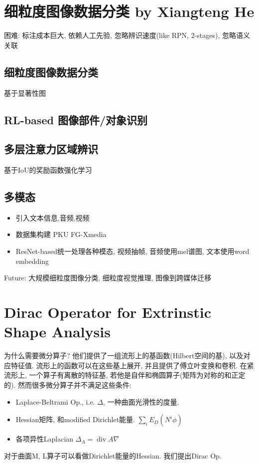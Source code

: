 \documentclass{article}
\begin{document}
\section{细粒度图像数据分类 by Xiangteng He}

困难: 标注成本巨大, 依赖人工先验, 忽略辨识速度(like RPN, 2-stages), 忽略语义关联

\subsection{细粒度图像数据分类}
    基于显著性图
\subsection{RL-based 图像部件/对象识别}
\subsection{多层注意力区域辨识}
    基于IoU的奖励函数强化学习
\subsection{多模态}
\begin{itemize}
    \item 引入文本信息,音频,视频
    \item 数据集构建 PKU FG-Xmedia
    \item ResNet-based统一处理各种模态, 视频抽帧, 音频使用mel谱图, 文本使用word embedding
\end{itemize}

Future: 大规模细粒度图像分类, 细粒度视觉推理, 图像到跨媒体迁移

\section{Dirac Operator for Extrinstic Shape Analysis}

为什么需要微分算子? 他们提供了一组流形上的基函数(Hilbert空间的基), 以及对应特征值. 流形上的函数可以在这些基上展开, 并且提供了傅立叶变换和卷积. 在紧流形上, 一个算子有离散的特征基, 若他是自伴和椭圆算子(矩阵为对称的和正定的). 然而很多微分算子并不满足这些条件:
\begin{itemize}
    \item Laplace-Beltrami Op., i.e. $\Delta$, 一种曲面光滑性的度量. 
    \item Hessian矩阵, 和modified Dirichlet能量. $\sum_i E_D(N^i\phi)$
    \item 各项异性Laplacian $\Delta_A=\operatorname{div} A \nabla$
\end{itemize}
对于曲面M, L算子可以看做Dirichlet能量的Hessian. 我们提出Dirac Op.
\end{document}
